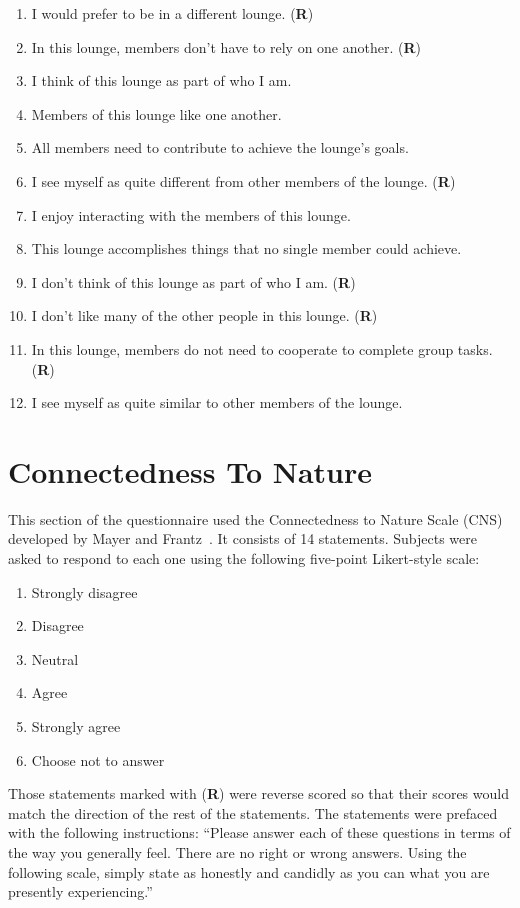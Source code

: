 \begin{enumerate}
	\item I would prefer to be in a different lounge. (\textbf{R})
	\item In this lounge, members don't have to rely on one another. (\textbf{R})
	\item I think of this lounge as part of who I am.
	\item Members of this lounge like one another.
	\item All members need to contribute to achieve the lounge's goals.
	\item I see myself as quite different from other members of the lounge. (\textbf{R})
	\item I enjoy interacting with the members of this lounge.
	\item This lounge accomplishes things that no single member could achieve.
	\item I don't think of this lounge as part of who I am. (\textbf{R})
	\item I don't like many of the other people in this lounge. (\textbf{R})
	\item In this lounge, members do not need to cooperate to complete group tasks. (\textbf{R})
	\item I see myself as quite similar to other members of the lounge.
\end{enumerate}


\section{Connectedness To Nature}
\label{cns-items}

This section of the questionnaire used the Connectedness to Nature Scale (CNS) developed by Mayer and Frantz~\cite{MayerFrantz2004}. It consists of 14 statements. Subjects were asked to respond to each one using the following five-point Likert-style scale:

\begin{enumerate}
	\item Strongly disagree
	\item Disagree
	\item Neutral
	\item Agree
	\item Strongly agree
	\item Choose not to answer
\end{enumerate}

Those statements marked with (\textbf{R}) were reverse scored so that their scores would match the direction of the rest of the statements. The statements were prefaced with the following instructions: ``Please answer each of these questions in terms of the way you generally feel. There are no right or wrong answers. Using the following scale, simply state as honestly and candidly as you can what you are presently experiencing.''

